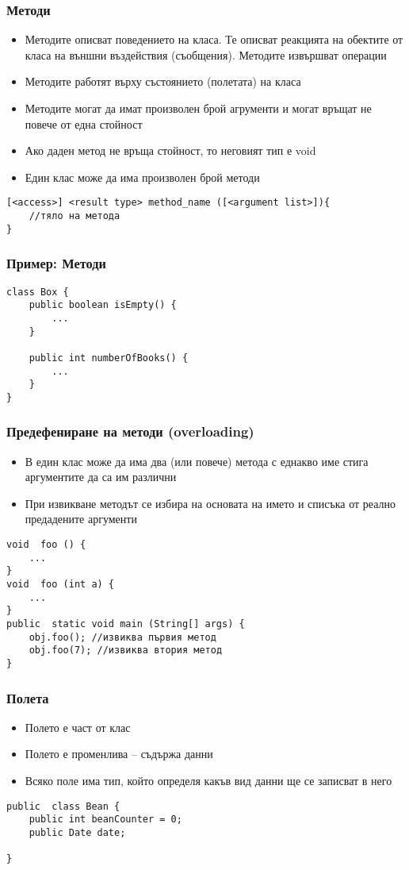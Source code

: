 \documentclass[ignorenonframetext, hyperref=unicode,compress]{beamer}
\begin{document}
\begin{frame}[containsverbatim]\frametitle{Методи}
\begin{itemize}
 \item Методите описват поведението на класа. 
Те описват реакцията на обектите от класа на външни въздействия (съобщения). 
Методите извършват операции
 \item Методите работят върху състоянието (полетата) на класа
 \item Методите могат да имат произволен брой агрументи и могат връщат не повече от една стойност
 \item Ако даден метод не връща стойност, то неговият тип е void
 \item Един клас може да има произволен брой методи
\end{itemize}
\begin{lstlisting}
[<access>] <result type> method_name ([<argument list>]){
	//тяло на метода
}
\end{lstlisting}
\end{frame}

\begin{frame}[containsverbatim]\frametitle{Пример: Методи}
\begin{lstlisting}
class Box {
	public boolean isEmpty() {
		...
	}

	public int numberOfBooks() {
		...
	}
}
\end{lstlisting}
\end{frame}


\begin{frame}[containsverbatim]\frametitle{Предефениране на методи (overloading)}
\begin{itemize}
 \item В един клас може да има два (или повече) метода с еднакво име стига аргументите да са им различни
 \item При извикване методът се избира на основата на името и списъка от реално предадените аргументи
\end{itemize}
\begin{lstlisting}
void  foo () {
	...
}
void  foo (int a) {
	...
}
public  static void main (String[] args) {
 	obj.foo(); //извиква първия метод
 	obj.foo(7); //извиква втория метод
}
\end{lstlisting}
\end{frame}


\begin{frame}[containsverbatim]\frametitle{Полета}
\begin{itemize}
 \item Полето е част от клас
 \item Полето е променлива – съдържа данни
 \item Всяко поле има тип, който определя какъв вид данни ще се записват в него
\end{itemize}
\begin{lstlisting}
public  class Bean {
 	public int beanCounter = 0;
 	public Date date;

}
\end{lstlisting}
\end{frame}
\end{document}
